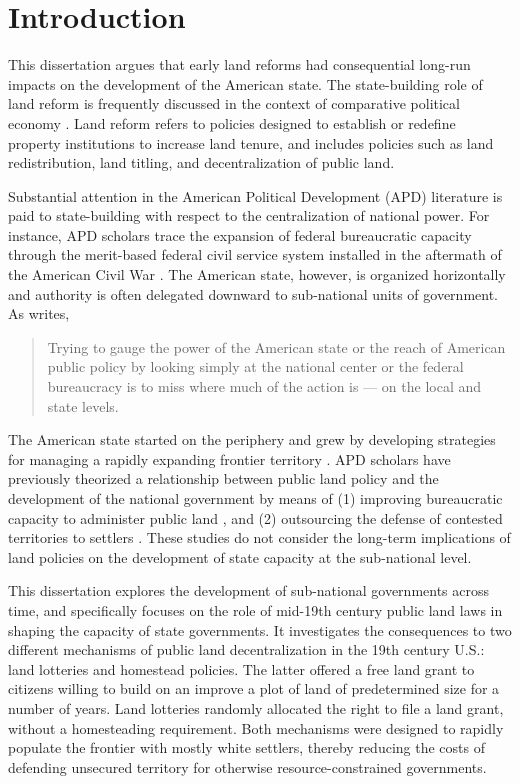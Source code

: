\chapter{Introduction} \label{diss-intro}

This dissertation argues that early land reforms had consequential long-run impacts on the development of the American state. The state-building role of land reform is frequently discussed in the context of comparative political economy \citep[e.g.,][]{albertus2015autocracy, murtazashvili2016does}. Land reform refers to policies designed to establish or redefine property institutions to increase land tenure, and includes policies such as land redistribution, land titling, and decentralization of public land. 

Substantial attention in the American Political Development (APD) literature is paid to state-building with respect to the centralization of national power. For instance, APD scholars trace the expansion of federal bureaucratic capacity through the merit-based federal civil service system installed in the aftermath of the American Civil War \citep{skowronek1982building,bensel1990,carpenter2001}. The American state, however, is organized horizontally and authority is often delegated downward to sub-national units of government. As \citet{novak2008myth} writes, 

\begin{quotation}
	Trying to gauge the power of the American state or the reach of American public policy by looking simply at the national center or the federal bureaucracy is to miss where much of the action is --- on the local and state levels.
\end{quotation}

The American state started on the periphery and grew by developing strategies for managing a rapidly expanding frontier territory \citep{greene1986peripheries}. APD scholars have previously theorized a relationship between public land policy and the development of the national government by means of (1) improving bureaucratic capacity to administer public land \citep{bensel1990}, and (2) outsourcing the defense of contested territories to settlers \citep{frymer2014rush,frymer2017building}. These studies do not consider the long-term implications of land policies on the development of state capacity at the sub-national level.

This dissertation explores the development of sub-national governments across time, and specifically focuses on the role of mid-19th century public land laws in shaping the capacity of state governments. It investigates the consequences to two different mechanisms of public land decentralization in the 19th century U.S.: land lotteries and homestead policies. The latter offered a free land grant to citizens willing to build on an improve a plot of land of predetermined size for a number of years. Land lotteries randomly allocated the right to file a land grant, without a homesteading requirement. Both mechanisms were designed to rapidly populate the frontier with mostly white settlers, thereby reducing the costs of defending unsecured territory for otherwise resource-constrained governments.

